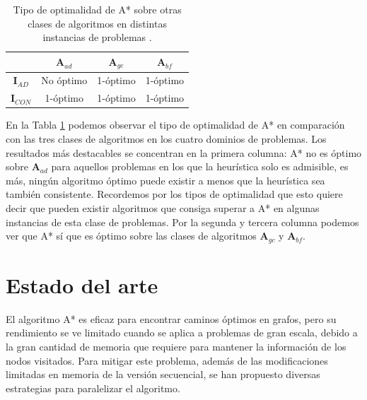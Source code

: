 \documentclass[a4paper,12pt]{article}
\begin{document}
\begingroup
\setlength{\tabcolsep}{12pt} %
\renewcommand{\arraystretch}{2} %
\begin{table}[H]
    \centering
    \begin{tabular}{|c||c|c|c|}
    \hline
    & $\textbf{A}_{ad}$ & $\textbf{A}_{gc}$ & $\textbf{A}_{bf}$ \\
    \hline\hline
    $\textbf{I}_{AD}$ & No óptimo & 1-óptimo & 1-óptimo \\
    \hline
    $\textbf{I}_{CON}$ & 1-óptimo & 1-óptimo & 1-óptimo \\
    \hline
    \end{tabular}
    \caption{Tipo de optimalidad de A* sobre otras clases de algoritmos en distintas instancias de problemas \cite{dechter1985generalized}.}
    \label{tab:optimality}
\end{table}
\endgroup

En la Tabla \ref{tab:optimality} podemos observar el tipo de optimalidad de A* en comparación con las tres clases de algoritmos en los cuatro dominios de problemas. Los resultados más destacables se concentran en la primera columna: A* no es óptimo sobre $\textbf{A}_{ad}$ para aquellos problemas en los que la heurística solo es admisible, es más, ningún algoritmo óptimo puede existir a menos que la heurística sea también consistente. Recordemos por los tipos de optimalidad que esto quiere decir que pueden existir algoritmos que consiga superar a A* en algunas instancias de esta clase de problemas. Por la segunda y tercera columna podemos ver que A* sí que es óptimo sobre las clases de algoritmos $\textbf{A}_{gc}$ y $\textbf{A}_{bf}$.

\newpage
\section{Estado del arte} \label{sec:estado_arte}

El algoritmo A* es eficaz para encontrar caminos óptimos en grafos, pero su rendimiento se ve limitado cuando se aplica a problemas de gran escala, debido a la gran cantidad de memoria que requiere para mantener la información de los nodos visitados. Para mitigar este problema, además de las modificaciones limitadas en memoria de la versión secuencial, se han propuesto diversas estrategias para paralelizar el algoritmo.
\end{document}
